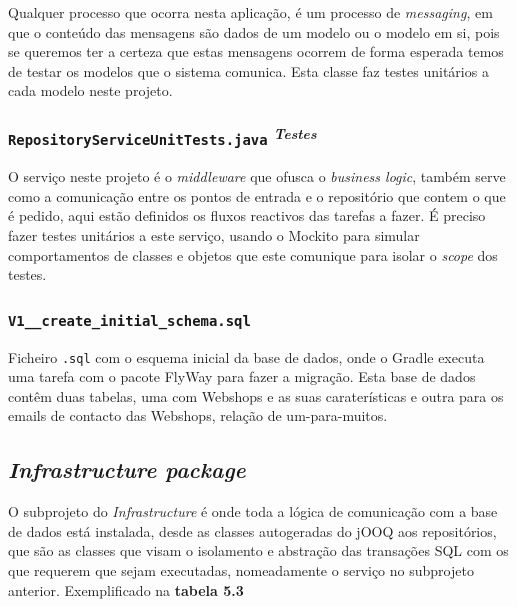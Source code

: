 Qualquer processo que ocorra nesta aplicação, é um processo de \textit{messaging}, em que o conteúdo das mensagens são dados de um modelo ou o modelo em si, pois se queremos ter a certeza que estas mensagens ocorrem de forma esperada temos de testar os modelos que o sistema comunica. Esta classe faz testes unitários a cada modelo neste projeto.

\subsubsection*{\texttt{RepositoryServiceUnitTests.java} \textsuperscript{\textit{Testes}}}

O serviço neste projeto é o \textit{middleware} que ofusca o \textit{business logic}, também serve como a comunicação entre os pontos de entrada e o repositório que contem o que é pedido, aqui estão definidos os fluxos reactivos das tarefas a fazer. É preciso fazer testes unitários a este serviço, usando o Mockito para simular comportamentos de classes e objetos que este comunique para isolar o \textit{scope} dos testes.

\subsubsection*{\texttt{V1\_\_create\_initial\_schema.sql}}

Ficheiro \texttt{.sql} com o esquema inicial da base de dados, onde o Gradle executa uma tarefa com o pacote FlyWay para fazer a migração. Esta base de dados contêm duas tabelas, uma com Webshops e as suas caraterísticas e outra para os emails de contacto das Webshops, relação de um-para-muitos.

\subsection{\textit{\textit{Infrastructure} package}}\label{infra}

O subprojeto do \textit{Infrastructure} é onde toda a lógica de comunicação com a base de dados está instalada, desde as classes autogeradas do jOOQ aos repositórios, que são as classes que visam o isolamento e abstração das transações SQL com os que requerem que sejam executadas, nomeadamente o serviço no subprojeto anterior. Exemplificado na \textbf{tabela 5.3}


